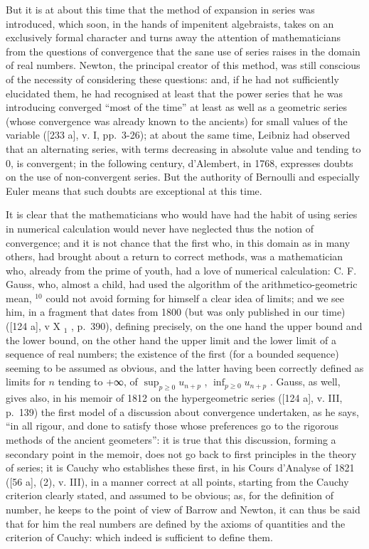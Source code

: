 But it is at about this time that the method of expansion in series was introduced, which soon, in the hands of impenitent algebraists, takes on an exclusively formal character and turns away the attention of mathematicians from the questions of convergence that the sane use of series raises in the domain of real numbers. Newton, the principal creator of this method, was still conscious of the necessity of considering these questions: and, if he had not sufficiently elucidated them, he had recognised at least that the power series that he was introducing converged ``most of the time'' at least as well as a geometric series (whose convergence was already known to the ancients) for small values of the variable ({[}233 a{]}, v. I, pp.~3-26); at about the same time, Leibniz had observed that an alternating series, with terms decreasing in absolute value and tending to 0, is convergent; in the following century, d'Alembert, in 1768, expresses doubts on the use of non-convergent series. But the authority of Bernoulli and especially Euler means that such doubts are exceptional at this time.

It is clear that the mathematicians who would have had the habit of using series in numerical calculation would never have neglected thus the notion of convergence; and it is not chance that the first who, in this domain as in many others, had brought about a return to correct methods, was a mathematician who, already from the prime of youth, had a love of numerical calculation: C. F. Gauss, who, almost a child, had used the algorithm of the arithmetico-geometric mean, \(^{10}\) could not avoid forming for himself a clear idea of limits; and we see him, in a fragment that dates from 1800 (but was only published in our time) ({[}124 a{]}, v X \(_1\) , p.~390), defining precisely, on the one hand the upper bound and the lower bound, on the other hand the upper limit and the lower limit of a sequence of real numbers; the existence of the first (for a bounded sequence) seeming to be assumed as obvious, and the latter having been correctly defined as limits for \(n\) tending to +∞, of \(\sup_{p≥0} u_{n+p}\) , \(\inf_{p≥0} u_{n+p}\) . Gauss, as well, gives also, in his memoir of 1812 on the hypergeometric series ({[}124 a{]}, v. III, p.~139) the first model of a discussion about convergence undertaken, as he says, ``in all rigour, and done to satisfy those whose preferences go to the rigorous methods of the ancient geometers'': it is true that this discussion, forming a secondary point in the memoir, does not go back to first principles in the theory of series; it is Cauchy who establishes these first, in his Cours d'Analyse of 1821 ({[}56 a{]}, (2), v. III), in a manner correct at all points, starting from the Cauchy criterion clearly stated, and assumed to be obvious; as, for the definition of number, he keeps to the point of view of Barrow and Newton, it can thus be said that for him the real numbers are defined by the axioms of quantities and the criterion of Cauchy: which indeed is sufficient to define them.

